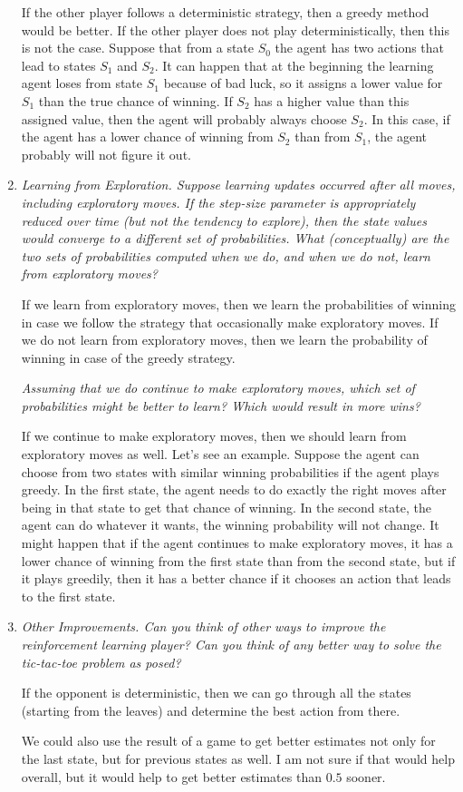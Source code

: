\documentclass[12pt,a4paper]{article}
\begin{document}
\begin{enumerate}
    If the other player follows a deterministic strategy, then a greedy method would be better. If the other player does not play deterministically, then this is not the case. Suppose that from a state $S_0$ the agent has two actions that lead to states $S_1$ and $S_2$. It can happen that at the beginning the learning agent loses from state $S_1$ because of bad luck, so it assigns a lower value for $S_1$ than the true chance of winning. If $S_2$ has a higher value than this assigned value, then the agent will probably always choose $S_2$. In this case, if the agent has a lower chance of winning from $S_2$ than from $S_1$, the agent probably will not figure it out.

  \item
    \textit{Learning from Exploration. Suppose learning updates occurred after all moves, including exploratory moves. If the step-size parameter is appropriately reduced over time (but not the tendency to explore), then the state values would converge to a different set of probabilities. What (conceptually) are the two sets of probabilities computed when we do, and when we do not, learn from exploratory moves?}

    If we learn from exploratory moves, then we learn the probabilities of winning in case we follow the strategy that occasionally make exploratory moves. If we do not learn from exploratory moves, then we learn the probability of winning in case of the greedy strategy.

    \textit{Assuming that we do continue to make exploratory moves, which set of probabilities might be better to learn? Which would result in more wins?}

    If we continue to make exploratory moves, then we should learn from exploratory moves as well. Let's see an example. Suppose the agent can choose from two states with similar winning probabilities if the agent plays greedy. In the first state, the agent needs to do exactly the right moves after being in that state to get that chance of winning. In the second state, the agent can do whatever it wants, the winning probability will not change. It might happen that if the agent continues to make exploratory moves, it has a lower chance of winning from the first state than from the second state, but if it plays greedily, then it has a better chance if it chooses an action that leads to the first state.

  \item
    \textit{Other Improvements. Can you think of other ways to improve the reinforcement learning player? Can you think of any better way to solve the tic-tac-toe problem as posed?}

    If the opponent is deterministic, then we can go through all the states (starting from the leaves) and determine the best action from there.

    We could also use the result of a game to get better estimates not only for the last state, but for previous states as well. I am not sure if that would help overall, but it would help to get better estimates than $0.5$ sooner. 


\end{enumerate}
\end{document}
